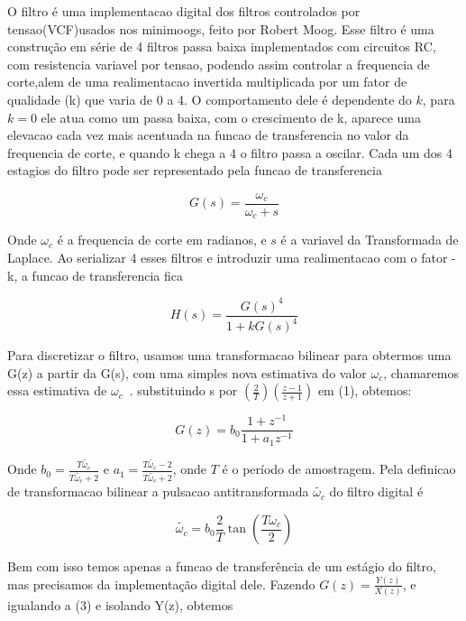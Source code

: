 \documentclass{article}
\begin{document}
O filtro é uma implementacao digital dos filtros controlados por tensao(VCF)usados nos minimoogs, feito por Robert Moog. Esse filtro é uma construção em série de 4 filtros passa baixa implementados com circuitos RC, com resistencia variavel por tensao, podendo assim controlar a frequencia de corte,alem de uma realimentacao invertida multiplicada por um fator de qualidade (k) que varia de 0 a 4.
O comportamento dele é dependente do $k$, para $k=0$ ele atua como um passa baixa, com o crescimento de k, aparece uma elevacao 
cada vez mais acentuada na funcao de transferencia no valor da frequencia de corte, e quando k chega a 4 o filtro passa a oscilar.
Cada um dos 4 estagios do filtro pode ser representado pela funcao de transferencia

\begin{equation}\label{eq:(1)}
G(s) = \frac{\omega_c}{\omega_c+s}  
\end{equation}

Onde $\omega_c$ é a frequencia de corte em radianos, e $s$ é a variavel da Transformada de Laplace.
Ao serializar 4 esses filtros e introduzir uma realimentacao com o fator -k, a funcao de transferencia fica

\begin{equation}\label{eq:(2)}
 H(s) = \frac{G(s)^4}{1+k G(s)^4} 
\end{equation}


Para discretizar o filtro, usamos uma transformacao bilinear para obtermos uma G(z) a partir da G(s), 
com uma simples nova estimativa do valor $\omega_c$, chamaremos essa estimativa de $\omega_c$~.
substituindo s por $(\frac{2}{T})(\frac{z-1}{z+1})$ em (1), obtemos:

\begin{equation}\label{eq:(3)}
G(z) = b_0 \frac{1+z^{-1}}{1+a_1 z^{-1}}  
\end{equation}


Onde $b_0 = \frac{T \tilde{\omega_c}}{T \tilde{\omega_c}+2}$ e $a_1 = \frac{T \tilde{\omega_c} -2}{T\tilde{\omega_c} +2}$, onde $T$ é o período de amostragem.
Pela definicao de transformacao bilinear a pulsacao antitransformada $\tilde{\omega_c}$ do filtro digital é

\begin{equation}\label{eq:(4)}
\tilde{\omega_c} = b_0 \frac{2}{T} \tan({\frac{T \omega_c}{2}} ) 
\end{equation}

Bem com isso temos apenas a funcao de transferência de um estágio do filtro, mas precisamos da implementação digital dele.
Fazendo $G(z) = \frac{Y(z)}{X(z)}$, e igualando a (3) e isolando Y(z), obtemos
\end{document}
